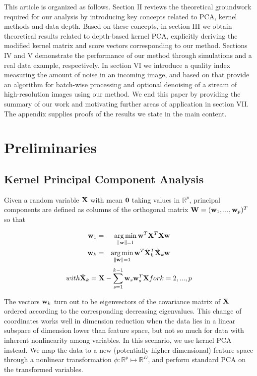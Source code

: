 \documentclass[10pt, conference, compsocconf]{IEEEtran}
\DeclareMathOperator*{\argmin}{arg\,min}
\begin{document}
This article is organized as follows. Section II reviews the theoretical groundwork required for our analysis by introducing key concepts related to PCA, kernel methods and data depth. Based on these concepts, in section III we obtain theoretical results related to depth-based kernel PCA, explicitly deriving the modified kernel matrix and score vectors corresponding to our method. Sections IV and V demonstrate the performance of our method through simulations and a real data example, respectively. In section VI we introduce a quality index measuring the amount of noise in an incoming image, and based on that provide an algorithm for batch-wise processing and optional denoising of a stream of high-resolution images using our method. We end this paper by providing the summary of our work and motivating further areas of application in section VII. The appendix supplies proofs of the results we state in the main content.

\section{Preliminaries}\label{section:sec2}

\subsection{Kernel Principal Component Analysis}

Given a random variable ${\mathbf{X}}$ with mean $\bf0$ taking values in $\mathbb{R}^p$, principal components are defined as columns of the orthogonal matrix ${\mathbf{W}} = ({\bf{w}}_1, ... ,{\bf{w}}_p)^T$ so that

\begin{eqnarray}
\bfw_1 &=& \argmin_{\| \bfw \| = 1} \bfw^T \bfX^T\bfX \bfw \\
\bfw_k &=& \argmin_{\| \bfw \| = 1} \bfw^T \hat \bfX^T_k \hat \bfX_k \bfw
\end{eqnarray}
$$ \relax{ with } \hat {{\mathbf{X}}}_k = {\mathbf{X}} - \sum_{s=1}^{k-1} {\bf{w}}_s {\bf{w}}_s^T {\mathbf{X}} \relax{ for } k = 2,...,p $$

The vectors ${\bf{w}}_k$ turn out to be eigenvectors of the covariance matrix of ${\mathbf{X}}$ ordered according to the corresponding decreasing eigenvalues. This change of coordinates works well in dimension reduction when the data lies in a linear subspace of dimension lower than feature space, but not so much for data with inherent nonlinearity among variables. In this scenario, we use kernel PCA \cite{Scholkopf99} instead. We map the data to a new (potentially higher dimensional) feature space through a nonlinear transformation $\phi: \mathbb{R}^p \mapsto \mathbb R^D$, and perform standard PCA on the transformed variables.
\end{document}
